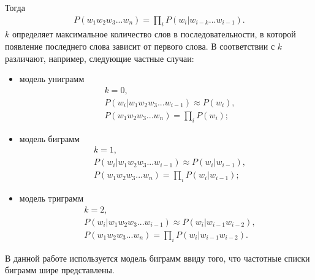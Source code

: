 Тогда
\begin{align}
	P(w_1w_2w_3...w_n) = \prod_{i}P(w_i|w_{i-k}...w_{i-1}).
\end{align}
\(k\) определяет максимальное количество слов в последовательности, в которой появление последнего слова зависит от первого слова. В соответствии с \(k\) различают, например, следующие частные случаи:
\begin{itemize}
	\item
	модель униграмм
	\begin{align}
		&k = 0, \nonumber \\
		&P(w_i|w_1w_2w_3...w_{i-1}) \approx P(w_i), \\
		&P(w_1w_2w_3...w_n) = \prod_{i}P(w_i); 
	\end{align}
	\item
	модель биграмм
	\begin{align}
		&k = 1, \nonumber \\
		&P(w_i|w_1w_2w_3...w_{i-1}) \approx P(w_i|w_{i-1}), \\
		&P(w_1w_2w_3...w_n) = \prod_{i}P(w_i|w_{i-1});
	\end{align}
	\item
	модель триграмм
	\begin{align}
		&k = 2, \nonumber \\
		&P(w_i|w_1w_2w_3...w_{i-1}) \approx P(w_i|w_{i-1}w_{i-2}), \\
		&P(w_1w_2w_3...w_n) = \prod_{i}P(w_i|w_{i-1}w_{i-2}).
	\end{align}
\end{itemize}
В данной работе используется модель биграмм ввиду того, что частотные списки биграмм шире представлены.
